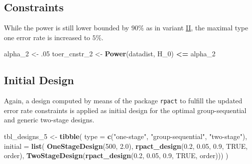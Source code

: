 \documentclass[]{book}
\newenvironment{Shaded}{\begin{snugshade}}{\end{snugshade}}
\newcommand{\DataTypeTok}[1]{\textcolor[rgb]{0.13,0.29,0.53}{#1}}
\newcommand{\DecValTok}[1]{\textcolor[rgb]{0.00,0.00,0.81}{#1}}
\newcommand{\FloatTok}[1]{\textcolor[rgb]{0.00,0.00,0.81}{#1}}
\newcommand{\KeywordTok}[1]{\textcolor[rgb]{0.13,0.29,0.53}{\textbf{#1}}}
\newcommand{\NormalTok}[1]{#1}
\newcommand{\OperatorTok}[1]{\textcolor[rgb]{0.81,0.36,0.00}{\textbf{#1}}}
\newcommand{\OtherTok}[1]{\textcolor[rgb]{0.56,0.35,0.01}{#1}}
\newcommand{\StringTok}[1]{\textcolor[rgb]{0.31,0.60,0.02}{#1}}
\begin{document}
\hypertarget{constraints-9}{%
\subsection{Constraints}\label{constraints-9}}

While the power is still lower bounded by \(90\%\) as in variant \protect\hyperlink{variantIV_2}{II},
the maximal type one error rate is increased to \(5\%\).

\begin{Shaded}
\begin{Highlighting}[]
\NormalTok{alpha_}\DecValTok{2}\NormalTok{      <-}\StringTok{ }\FloatTok{.05}
\NormalTok{toer_cnstr_}\DecValTok{2}\NormalTok{ <-}\StringTok{ }\KeywordTok{Power}\NormalTok{(datadist, H_}\DecValTok{0}\NormalTok{) }\OperatorTok{<=}\StringTok{ }\NormalTok{alpha_}\DecValTok{2}
\end{Highlighting}
\end{Shaded}

\hypertarget{initial-design-7}{%
\subsection{Initial Design}\label{initial-design-7}}

Again, a design computed by means of the package \texttt{rpact} to fulfill
the updated error rate constraints is applied as initial design for the
optimal group-sequential and generic two-stage designs.

\begin{Shaded}
\begin{Highlighting}[]
\NormalTok{tbl_designs_}\DecValTok{5}\NormalTok{ <-}\StringTok{ }\KeywordTok{tibble}\NormalTok{(}
    \DataTypeTok{type    =} \KeywordTok{c}\NormalTok{(}\StringTok{"one-stage"}\NormalTok{, }\StringTok{"group-sequential"}\NormalTok{, }\StringTok{"two-stage"}\NormalTok{),}
    \DataTypeTok{initial =} \KeywordTok{list}\NormalTok{(}
        \KeywordTok{OneStageDesign}\NormalTok{(}\DecValTok{500}\NormalTok{, }\FloatTok{2.0}\NormalTok{),}
        \KeywordTok{rpact_design}\NormalTok{(}\FloatTok{0.2}\NormalTok{, }\FloatTok{0.05}\NormalTok{, }\FloatTok{0.9}\NormalTok{, }\OtherTok{TRUE}\NormalTok{, order),}
        \KeywordTok{TwoStageDesign}\NormalTok{(}\KeywordTok{rpact_design}\NormalTok{(}\FloatTok{0.2}\NormalTok{, }\FloatTok{0.05}\NormalTok{, }\FloatTok{0.9}\NormalTok{, }\OtherTok{TRUE}\NormalTok{, order))) )}
\end{Highlighting}
\end{Shaded}
\end{document}
